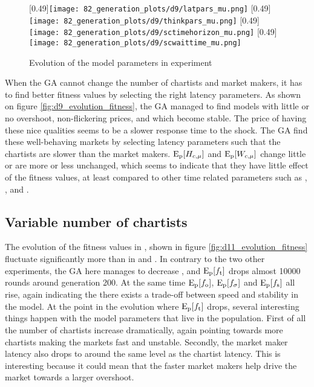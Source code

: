 \begin{figure}
	\centering
	[0.49\linewidth]{\texttt{[image: 82\_generation\_plots/d9/latpars\_mu.png]}}
	[0.49\linewidth]{\texttt{[image: 82\_generation\_plots/d9/thinkpars\_mu.png]}}
	[0.49\linewidth]{\texttt{[image: 82\_generation\_plots/d9/sctimehorizon\_mu.png]}}
	[0.49\linewidth]{\texttt{[image: 82\_generation\_plots/d9/scwaittime\_mu.png]}}
	\caption{Evolution of the model parameters in experiment \dten}
	\label{fig:d9_evolution_parameters}
\end{figure}

When the GA cannot change the number of chartists and market makers, it has to find better fitness values by selecting the right latency parameters. As shown on figure \ref{fig:d9_evolution_fitness}, the GA managed to find models with little or no overshoot, non-flickering prices, and which become stable. The price of having these nice qualities seems to be a slower response time to the shock. The GA find these well-behaving markets by selecting latency parameters such that the chartists are slower than the market makers. $\mathrm{E}_\text{p}[H_{c, \mu}]$ and $\mathrm{E}_\text{p}[W_{c, \mu}]$ change little or are more or less unchanged, which seems to indicate that they have little effect of the fitness values, at least compared to other time related parameters such as \sclatencymu, \ssmmlatencymu, \scthinkmu{} and \ssmmthinkmu. 


\subsection{Variable number of chartists}
The evolution of the fitness values in \deleven, shown in figure \ref{fig:d11_evolution_fitness} fluctuate significantly more than in \dnine{} and \dten. In contrary to the two other experiments, the GA here manages to decrease \timetoreachnewfundamental, and $\mathrm{E}_\text{p}[f_\text{t}]$ drops almost 10000 rounds around generation 200. At the same time $\mathrm{E}_\text{p}[f_\text{o}]$, $\mathrm{E}_\text{p}[f_\sigma]$ and $\mathrm{E}_\text{p}[f_\text{s}]$ all rise, again indicating the there exists a trade-off between speed and stability in the model. At the point in the evolution where $\mathrm{E}_\text{p}[f_\text{t}]$ drops, several interesting things happen with the model parameters that live in the population. First of all the number of chartists increase dramatically, again pointing towards more chartists making the markets fast and unstable. Secondly, the market maker latency also drops to around the same level as the chartist latency. This is interesting because it could mean that the faster market makers help drive the market towards a larger overshoot.

